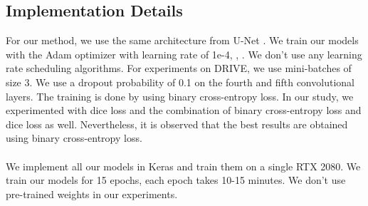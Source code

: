 \documentclass{article}
\begin{document}
\subsection{Implementation Details}
For our method, we use the same architecture from U-Net \cite{ronneberger2015unet}. We train our models with the Adam optimizer \cite{kingma2017adam} with learning rate of 1e-4, , . We don’t use any learning rate scheduling algorithms. For experiments on DRIVE, we use mini-batches of size 3. We use a dropout probability of 0.1 on the fourth and fifth convolutional layers. The training is done by using binary cross-entropy loss. In our study, we experimented with dice loss and the combination of binary cross-entropy loss and dice loss \cite{Sudre_2017} as well. Nevertheless, it is observed that the best results are obtained using binary cross-entropy loss. \\\\

We implement all our models in Keras \cite{chollet2015} and train them on a single RTX 2080. We train our models for 15 epochs, each epoch takes 10-15 minutes. We don't use pre-trained weights in our experiments.
\end{document}
